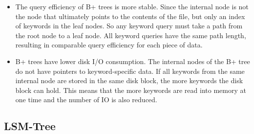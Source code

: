\begin{enumerate}
\begin{itemize}
    \item The query efficiency of B+ trees is more stable.  Since the internal node is not the node that ultimately points to the contents of the file, but only an index of keywords in the leaf nodes. So any keyword query must take a path from the root node to a leaf node. All keyword queries have the same path length, resulting in comparable query efficiency for each piece of data.
    \item B+ trees have lower disk I/O consumption. The internal nodes of the B+ tree do not have pointers to keyword-specific data. If all keywords from the same internal node are stored in the same disk block, the more keywords the disk block can hold. This means that the more keywords are read into memory at one time and the number of IO is also reduced.
\end{itemize}

\end{enumerate}
\subsection{LSM-Tree}

